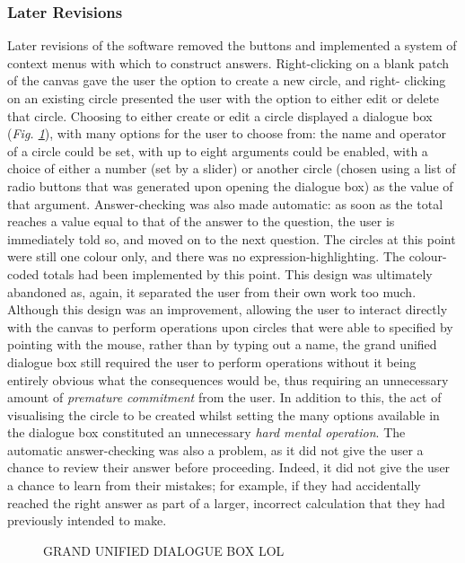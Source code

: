 \documentclass[12pt,twoside,notitlepage,xetex]{report}
\begin{document}
\subsubsection{Later Revisions}
Later revisions of the software removed the buttons and implemented a system of
context menus with which to construct answers. Right-clicking on a blank patch
of the canvas gave the user the option to create a new circle, and right-
clicking on an existing circle presented the user with the option to either
edit or delete that circle.  Choosing to either create or edit a circle
displayed a dialogue box (\emph{Fig. \ref{fig:GUDB}}), with many options for the user to
choose from: the name and operator of a circle could be set, with up to eight
arguments could be enabled, with a choice of either a number (set by a slider)
or another circle (chosen using a list of radio buttons that was generated upon
opening the dialogue box) as the value of that argument.  Answer-checking was
also made automatic: as soon as the total reaches a value equal to that of the
answer to the question, the user is immediately told so, and moved on to the
next question.  The circles at this point were still one colour only, and there
was no expression-highlighting.  The colour-coded totals had been implemented by
this point.  This design was ultimately abandoned as, again, it separated the
user from their own work too much.  Although this design was an improvement,
allowing the user to interact directly with the canvas to perform operations
upon circles that were able to specified by pointing with the mouse, rather
than by typing out a name, the grand unified dialogue box still required the
user to perform operations without it being entirely obvious what the
consequences would be, thus requiring an unnecessary amount of
\emph{premature commitment} from the user.  In addition to this, the act of
visualising the circle to be created whilst setting the many options available
in the dialogue box constituted an unnecessary \emph{hard mental operation}.
The automatic answer-checking was also a problem, as it did not give the user a
chance to review their answer before proceeding.  Indeed, it did not give the
user a chance to learn from their mistakes; for example, if they had
accidentally reached the right answer as part of a larger, incorrect
calculation that they had previously intended to make.
\begin{center}
\begin{figure}[H]
\begin{center}
{\Huge \sfapp GRAND UNIFIED DIALOGUE BOX LOL}
\end{center}
\caption{}
\label{fig:GUDB}
\end{figure}
\end{center}
\end{document}
